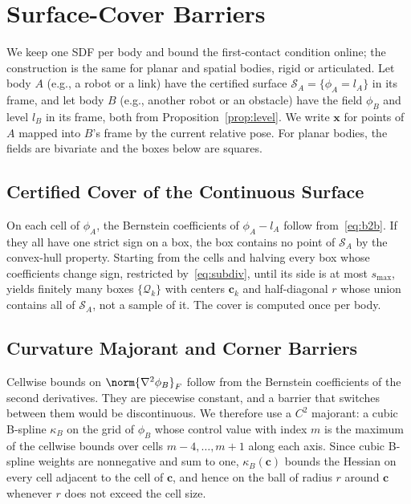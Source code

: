 \section{Surface-Cover Barriers}\label{sec:cover}
We keep one SDF per body and bound the first-contact condition online; the construction is the same
for planar and spatial bodies, rigid or articulated. Let body $A$ (e.g., a robot or a link) have the
certified surface $\mathcal S_A=\{\phi_A=l_A\}$ in its frame, and let body $B$ (e.g., another robot or
an obstacle) have the field $\phi_B$ and level $l_B$ in its frame, both from
Proposition~\ref{prop:level}. We write $\mathbf x$ for points of $A$ mapped into $B$'s frame by the
current relative pose. For planar bodies, the fields are bivariate and the boxes below are squares.

\subsection{Certified Cover of the Continuous Surface}
On each cell of $\phi_A$, the Bernstein coefficients of $\phi_A-l_A$ follow from~\eqref{eq:b2b}. If
they all have one strict sign on a box, the box contains no point of $\mathcal S_A$ by the
convex-hull property. Starting from the cells and halving every box whose coefficients change sign,
restricted by~\eqref{eq:subdiv}, until its side is at most $s_{\max}$, yields finitely many boxes
$\{\mathcal Q_k\}$ with centers $\mathbf c_k$ and half-diagonal $r$ whose union contains all of
$\mathcal S_A$, not a sample of it. The cover is computed once per body.

\subsection{Curvature Majorant and Corner Barriers}
Cellwise bounds on $\norm{\nabla^2\phi_B}_F$ follow from the Bernstein coefficients of the
second derivatives. They are piecewise constant, and a barrier that switches between them would be
discontinuous. We therefore use a $C^2$ majorant: a cubic B-spline $\kappa_B$ on the grid of $\phi_B$
whose control value with index $m$ is the maximum of the cellwise bounds over cells $m-4,\dots,m+1$
along each axis. Since cubic B-spline weights are nonnegative and sum to one, $\kappa_B(\mathbf c)$
bounds the Hessian on every cell adjacent to the cell of $\mathbf c$, and hence on the ball of
radius $r$ around $\mathbf c$ whenever $r$ does not exceed the cell size.

